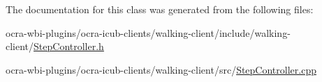 \-The documentation for this class was generated from the following files\-:\begin{DoxyCompactItemize}
\item 
ocra-\/wbi-\/plugins/ocra-\/icub-\/clients/walking-\/client/include/walking-\/client/\hyperlink{StepController_8h}{\-Step\-Controller.\-h}\item 
ocra-\/wbi-\/plugins/ocra-\/icub-\/clients/walking-\/client/src/\hyperlink{StepController_8cpp}{\-Step\-Controller.\-cpp}\end{DoxyCompactItemize}
